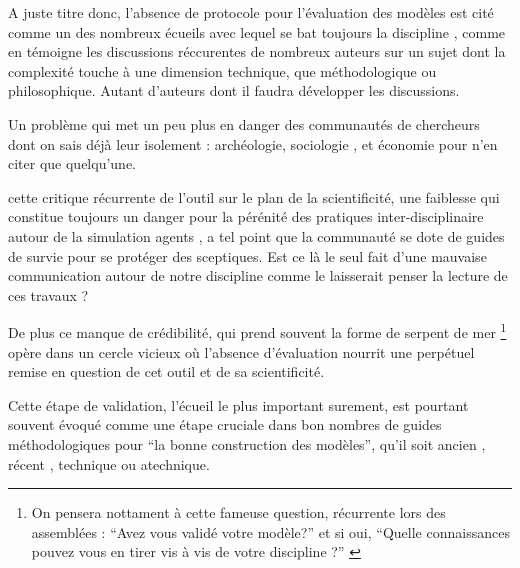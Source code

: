 {A juste titre donc, l'absence de protocole pour l'évaluation des modèles est cité comme un des nombreux écueils avec lequel se bat toujours la discipline \autocite{Heath2009}, comme en témoigne les discussions réccurentes de nombreux auteurs sur un sujet dont la complexité touche à une dimension technique, que méthodologique ou philosophique. Autant d'auteurs \autocite{Richiardi2006} \autocite{Fagiolo2007} \autocite{Moss2008} \autocite{Windrum2007} \autocite{Barlas1996} \autocite{Amblard2003} \autocite{OSullivan2004} \autocite{Doran2000} \autocite{Crooks2012} \autocite{Rouchier2013} dont il faudra développer les discussions.  

Un problème qui met un peu plus en danger des communautés de chercheurs dont on sais déjà leur isolement : archéologie, sociologie \autocite{Manzo2007}, et économie \autocite{Lehtinen2007} \autocite{Richiardi2006} pour n'en citer que quelqu'une. 

cette critique récurrente de l'outil sur le plan de la scientificité, une faiblesse qui constitue toujours un danger pour la pérénité des pratiques inter-disciplinaire autour de la simulation agents \autocite[220]{Squazzoni2010}, a tel point que la communauté se dote de guides de survie pour se protéger des sceptiques. \autocite{Waldherr2013} Est ce là le seul fait d'une mauvaise communication autour de notre discipline comme le laisserait penser la lecture de ces travaux ? 

De plus ce manque de crédibilité, qui prend souvent la forme de serpent de mer \footnote{ On pensera nottament à cette fameuse question, récurrente lors des assemblées : \enquote{Avez vous validé votre modèle?} et si oui, \enquote{Quelle connaissances pouvez vous en tirer vis à vis de votre discipline ?} \autocite{Amblard2006} } opère dans un cercle vicieux où l'absence d'évaluation nourrit une perpétuel remise en question de cet outil et de sa scientificité. %

Cette étape de validation, l'écueil le plus important surement, est pourtant souvent évoqué comme une étape cruciale dans bon nombres de guides méthodologiques pour \enquote{la bonne construction des modèles}, qu'il soit ancien \autocite[195]{Beshers1965} \autocite{Naylor1966, Naylor1967}, récent \autocite{Amblard2006, Gilbert2008}, technique ou atechnique. 

}
